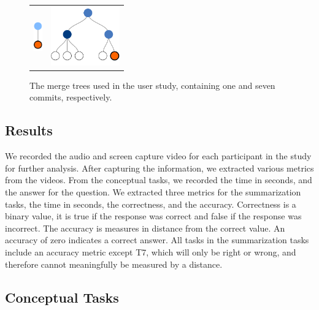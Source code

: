 \begin{figure}[bpt]
  \centering
\begin{tabular}{ m{1.5cm} m{3cm} }
  \includegraphics[height=0.5in]{figures/commits/1-commit.pdf} &
  \includegraphics[height=1in]{figures/commits/7-commits.pdf}\\
\end{tabular}
  \caption{The merge trees used in the user study,
    containing one and seven commits, respectively.}
  \label{fig:study_commits}
\end{figure}


\subsection{Results}
\label{sec:results}


We recorded the audio and screen capture video for each participant in
the study for further analysis.
After capturing the information, we
extracted various metrics from the videos.
From the conceptual tasks, we
recorded the time in seconds, and the answer for the question. We
extracted three metrics for the summarization tasks, the time in
seconds, the correctness, and the accuracy.
Correctness is a binary
value, it is true if the response was correct and false if the response
was incorrect.
The accuracy is measures in distance from the correct
value. An accuracy of zero indicates a correct answer. All tasks in the
summarization tasks include an accuracy metric except T7, which will
only be right or wrong, and therefore cannot meaningfully be measured by
a distance.

\subsection{Conceptual Tasks}
\label{sub:conceptual_tasks}

